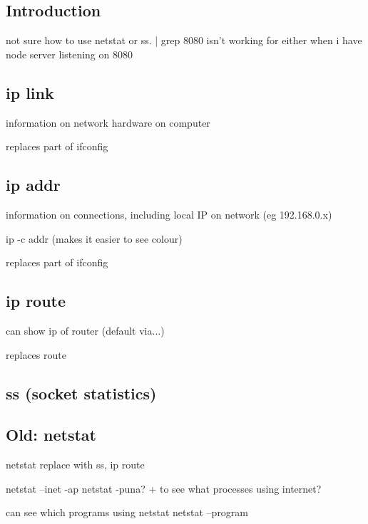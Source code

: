 
\subsection{Introduction}

not sure how to use netstat or ss. | grep 8080 isn't working for either when i have node server listening on 8080

\subsection{ip link}

information on network hardware on computer

replaces part of ifconfig
\subsection{ip addr}
information on connections, including local IP on network (eg 192.168.0.x)

ip -c addr (makes it easier to see colour)

replaces part of ifconfig
\subsection{ip route}
can show ip of router (default via...)

replaces route
\subsection{ss (socket statistics)}


\subsection{Old: netstat}
netstat replace with ss, ip route

netstat --inet -ap
netstat -puna?
+ to see what processes using internet?

can see which programs using netstat
netstat --program
